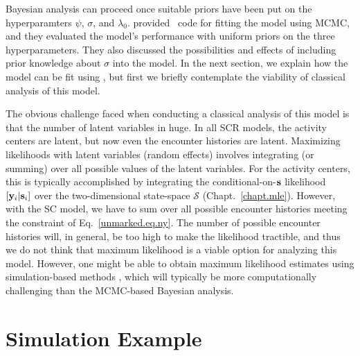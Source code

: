 
Bayesian analysis can proceed once suitable priors have been put on
the hyperparamters $\psi$, $\sigma$, and
$\lambda_0$. \citet{chandler_royle:2012} provided \R~code for fitting
the model using MCMC, and they evaluated the model's performance with
uniform priors on the three hyperparameters. They also discussed the
possibilities and effects of including prior knowledge about $\sigma$
into the model. In the next section, we explain how the model can be
fit using \jags, but first we briefly contemplate the viability of classical
analysis of this model.

The obvious challenge faced when conducting a classical analysis of
this model is that the number of latent variables in huge. In all SCR models, the activity centers are
latent, but now even the encounter histories are latent.
Maximizing likelihoods with latent variables (random effects) involves
integrating (or summing) over all possible values of the latent
variables. For the activity centers, this is typically accomplished by
integrating the conditional-on-$\bf s$ likelihood $[{\bf y}_i|{\bf s}_i]$ over the two-dimensional
state-space $\mathcal{S}$ (Chapt.~\ref{chapt.mle}). However, with
the SC model, we have to sum
over all possible encounter histories %
meeting the
constraint of Eq.~\ref{unmarked.eq.ny}. The
number of possible encounter histories
will, in general, be too high to make the likelihood tractible,
and thus we do not think that maximum likelihood is a viable option
for analyzing this model. However, one might be able to obtain maximum
likelihood estimates using simulation-based methods
\citep{lele_etal:2010},
which will typically be more computationally
challenging than the MCMC-based Bayesian analysis.


\section{Simulation Example}

